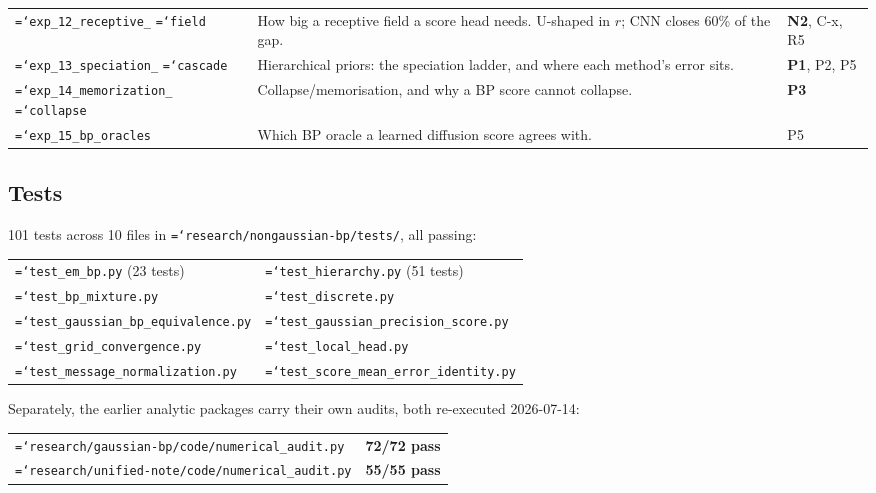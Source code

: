 \documentclass[11pt,a4paper]{article}
\newcommand{\code}[1]{\texttt{\small\hyphenchar\font=`\-\relax #1}}
\begin{document}
\begin{center}
\begin{longtable}{@{}p{2.9cm}p{9.0cm}p{2.9cm}@{}}
\code{exp\_12\_receptive\_} \code{field} & How big a receptive field a score head needs. U-shaped in $r$; CNN closes 60\% of the gap. & \textbf{N2}, C-x, R5 \\
\code{exp\_13\_speciation\_} \code{cascade} & Hierarchical priors: the speciation ladder, and where each method's error sits. & \textbf{P1}, P2, P5 \\
\code{exp\_14\_memorization\_} \code{collapse} & Collapse/memorisation, and why a BP score cannot collapse. & \textbf{P3} \\
\code{exp\_15\_bp\_oracles} & Which BP oracle a learned diffusion score agrees with. & P5 \\
\bottomrule
\end{longtable}
\end{center}

\subsection{Tests}

101 tests across 10 files in \code{research/nongaussian-bp/tests/}, all passing:

\begin{center}
\small
\begin{tabular}{@{}ll@{}}
\toprule
\code{test\_em\_bp.py} (23 tests) & \code{test\_hierarchy.py} (51 tests) \\
\code{test\_bp\_mixture.py} & \code{test\_discrete.py} \\
\code{test\_gaussian\_bp\_equivalence.py} & \code{test\_gaussian\_precision\_score.py} \\
\code{test\_grid\_convergence.py} & \code{test\_local\_head.py} \\
\code{test\_message\_normalization.py} & \code{test\_score\_mean\_error\_identity.py} \\
\bottomrule
\end{tabular}
\end{center}

\noindent
Separately, the earlier analytic packages carry their own audits, both re-executed
2026-07-14:

\begin{center}
\small
\begin{tabular}{@{}ll@{}}
\toprule
\code{research/gaussian-bp/code/numerical\_audit.py} & \textbf{72/72 pass} \\
\code{research/unified-note/code/numerical\_audit.py} & \textbf{55/55 pass} \\
\bottomrule
\end{tabular}
\end{center}
\end{document}

